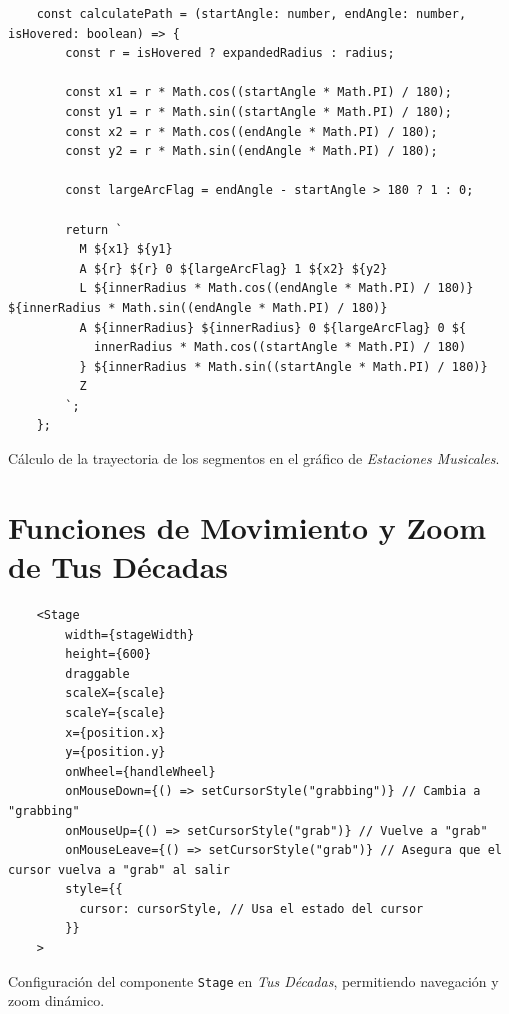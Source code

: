 \begin{ifalgorithm}[H]
    \begin{lstlisting}
    const calculatePath = (startAngle: number, endAngle: number, isHovered: boolean) => {
        const r = isHovered ? expandedRadius : radius;

        const x1 = r * Math.cos((startAngle * Math.PI) / 180);
        const y1 = r * Math.sin((startAngle * Math.PI) / 180);
        const x2 = r * Math.cos((endAngle * Math.PI) / 180);
        const y2 = r * Math.sin((endAngle * Math.PI) / 180);

        const largeArcFlag = endAngle - startAngle > 180 ? 1 : 0;

        return `
          M ${x1} ${y1}
          A ${r} ${r} 0 ${largeArcFlag} 1 ${x2} ${y2}
          L ${innerRadius * Math.cos((endAngle * Math.PI) / 180)} ${innerRadius * Math.sin((endAngle * Math.PI) / 180)}
          A ${innerRadius} ${innerRadius} 0 ${largeArcFlag} 0 ${
            innerRadius * Math.cos((startAngle * Math.PI) / 180)
          } ${innerRadius * Math.sin((startAngle * Math.PI) / 180)}
          Z
        `;
    };
    \end{lstlisting}
    \caption{Cálculo de la trayectoria de los segmentos en el gráfico de \textit{Estaciones Musicales}.}
    \label{alg:calculate_path}
\end{ifalgorithm}

\section*{Funciones de Movimiento y Zoom de Tus Décadas}

\begin{ifalgorithm}[H]
    \begin{lstlisting}
    <Stage
        width={stageWidth}
        height={600}
        draggable
        scaleX={scale}
        scaleY={scale}
        x={position.x}
        y={position.y}
        onWheel={handleWheel}
        onMouseDown={() => setCursorStyle("grabbing")} // Cambia a "grabbing"
        onMouseUp={() => setCursorStyle("grab")} // Vuelve a "grab"
        onMouseLeave={() => setCursorStyle("grab")} // Asegura que el cursor vuelva a "grab" al salir
        style={{
          cursor: cursorStyle, // Usa el estado del cursor
        }}
    >
    \end{lstlisting}
    \caption{Configuración del componente \texttt{Stage} en \textit{Tus Décadas}, permitiendo navegación y zoom dinámico.}
    \label{alg:stage_tus_decadas}
\end{ifalgorithm}

